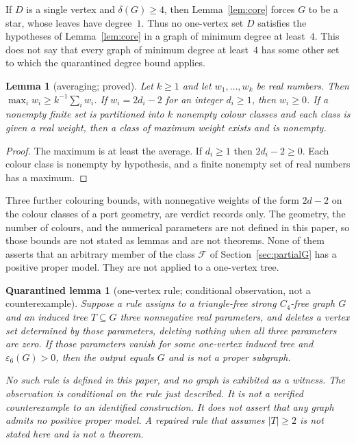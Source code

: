 \documentclass[11pt]{amsart}
\newtheorem{lemma}[theorem]{Lemma}
\newtheorem{qlemma}[theorem]{Quarantined lemma}
\theoremstyle{definition}
\theoremstyle{remark}
\begin{document}
If $D$ is a single vertex and $\delta(G)\ge 4$, then Lemma~\ref{lem:core} forces $G$ to be a star, whose leaves have degree~$1$. Thus no one-vertex set $D$ satisfies the hypotheses of Lemma~\ref{lem:core} in a graph of minimum degree at least~$4$. This does not say that every graph of minimum degree at least~$4$ has some other set to which the quarantined degree bound applies.

\begin{lemma}[averaging; proved]\label{lem:avg}
Let $k\ge 1$ and let $w_1,\ldots,w_k$ be real numbers. Then $\max_i w_i\ge k^{-1}\sum_i w_i$. If $w_i=2d_i-2$ for an integer $d_i\ge 1$, then $w_i\ge 0$. If a nonempty finite set is partitioned into $k$ nonempty colour classes and each class is given a real weight, then a class of maximum weight exists and is nonempty.
\end{lemma}

\begin{proof}
The maximum is at least the average. If $d_i\ge 1$ then $2d_i-2\ge 0$. Each colour class is nonempty by hypothesis, and a finite nonempty set of real numbers has a maximum.
\end{proof}

Three further colouring bounds, with nonnegative weights of the form $2d-2$ on the colour classes of a port geometry, are verdict records only. The geometry, the number of colours, and the numerical parameters are not defined in this paper, so those bounds are not stated as lemmas and are not theorems. None of them asserts that an arbitrary member of the class $\mathcal F$ of Section~\ref{sec:partialG} has a positive proper model. They are not applied to a one-vertex tree.

\begin{qlemma}[one-vertex rule; conditional observation, not a counterexample]\label{lem:singleton}
Suppose a rule assigns to a triangle-free strong $C_4$-free graph $G$ and an induced tree $T\subseteq G$ three nonnegative real parameters, and deletes a vertex set determined by those parameters, deleting nothing when all three parameters are zero. If those parameters vanish for some one-vertex induced tree and $\varepsilon_6(G)>0$, then the output equals $G$ and is not a proper subgraph.

No such rule is defined in this paper, and no graph is exhibited as a witness. The observation is conditional on the rule just described. It is not a verified counterexample to an identified construction. It does not assert that any graph admits no positive proper model. A repaired rule that assumes $|T|\ge 2$ is not stated here and is not a theorem.
\end{qlemma}
\end{document}
